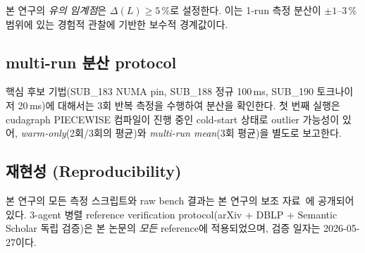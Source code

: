 본 연구의 \emph{유의 임계점}은 $\Delta(L) \geq 5\,\%$로 설정한다. 이는 1-run 측정 분산이 $\pm 1$--$3\,\%$ 범위에 있는 경험적 관찰에 기반한 보수적 경계값이다.

\subsection{multi-run 분산 protocol}
\label{subsec:multirun}

핵심 후보 기법(SUB\_183 NUMA pin, SUB\_188 정규 100\,ms, SUB\_190 토크나이저 20\,ms)에 대해서는 3회 반복 측정을 수행하여 분산을 확인한다.
첫 번째 실행은 cudagraph PIECEWISE 컴파일이 진행 중인 cold-start 상태로 outlier 가능성이 있어, \emph{warm-only}(2회/3회의 평균)와 \emph{multi-run mean}(3회 평균)을 별도로 보고한다.

\subsection{재현성 (Reproducibility)}

본 연구의 모든 측정 스크립트와 raw bench 결과는 본 연구의 보조 자료~\cite{ourrepo}에 공개되어 있다.
3-agent 병렬 reference verification protocol(arXiv + DBLP + Semantic Scholar 독립 검증)은 본 논문의 \emph{모든} reference에 적용되었으며, 검증 일자는 2026-05-27이다.
